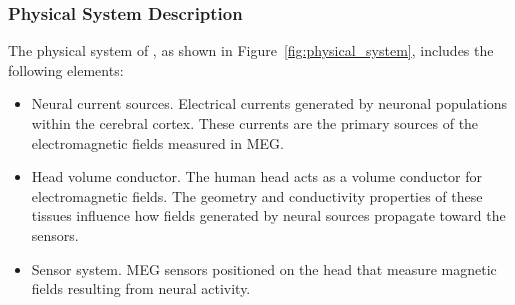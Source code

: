 \documentclass[12pt]{article}
\begin{document}
\subsubsection{Physical System Description} \label{sec_phySystDescrip}



The physical system of \progname{}, as shown in Figure~\ref{fig:physical_system},
includes the following elements:




\begin{itemize}
  \item[PS1:] Neural current sources. Electrical currents generated by neuronal populations within the cerebral cortex. These currents are the primary sources of the electromagnetic fields measured in MEG.
  \item[PS2:] Head volume conductor. The human head acts as a volume conductor for electromagnetic fields. The geometry and conductivity properties of these tissues influence how fields generated by neural sources propagate toward the sensors.
  \item[PS3:] Sensor system. MEG sensors positioned on the head that measure magnetic fields resulting from neural activity.

\end{itemize}
\end{document}
